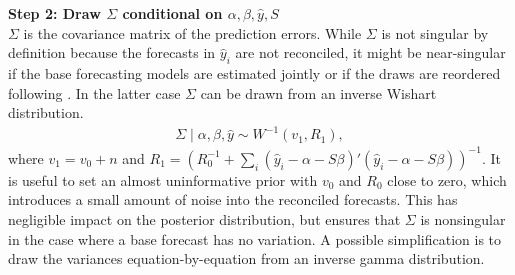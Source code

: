 \documentclass[a4paper,fleqn,11pt]{article}
\begin{document}
\noindent\textbf{Step 2: Draw $\Sigma$ conditional on $\alpha,\beta,\hat{y},S$}\\
$\Sigma$ is the covariance matrix of the prediction errors. While $\Sigma$ is not singular by definition because the forecasts in $\hat{y}_{i}$ are not reconciled, it might be near-singular if the base forecasting models are estimated jointly or if the draws are reordered following \cite{Jeon2018}. In the latter case $\Sigma$ can be drawn from an inverse Wishart distribution.
\begin{align}
\Sigma \mid \alpha,\beta,\hat{y} \sim W^{-1}(v_1,R_1),
\end{align}
where $v_1 = v_0 + n$ and $R_1 = \left( R_0^{-1} + \sum_i (\hat{y}_i - \alpha - S \beta)'(\hat{y}_i - \alpha - S \beta) \right)^{-1}$. It is useful to set an almost uninformative prior with $v_0$ and $R_0$ close to zero, which introduces a small amount of noise into the reconciled forecasts. This has negligible impact on the posterior distribution, but ensures that $\Sigma$ is nonsingular in the case where a base forecast has no variation. A possible simplification is to draw the variances equation-by-equation from an inverse gamma distribution.
\end{document}
